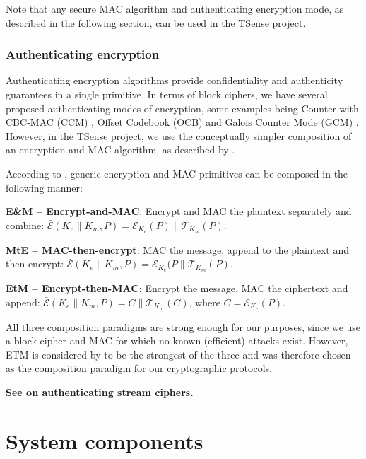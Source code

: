 Note that any secure MAC algorithm and authenticating encryption mode, as described in the following section, can be used in the TSense project.

\subsubsection{Authenticating encryption}

Authenticating encryption algorithms provide confidentiality and authenticity guarantees in a single primitive. In terms of block ciphers, we have several proposed authenticating modes of encryption, some examples being Counter with CBC-MAC (CCM) , Offset Codebook (OCB) \cite{rogaway2003} and Galois Counter Mode (GCM) . However, in the TSense project, we use the conceptually simpler composition of an encryption and MAC algorithm, as described by .

According to , generic encryption and MAC primitives can be composed in the following manner:
%
\begin{description}
\item \textbf{E\&M -- Encrypt-and-MAC}: Encrypt and MAC the plaintext separately and combine: $\bar{\mathcal{E}}(K_e \parallel K_m,P) = \mathcal{E}_{K_e}(P) \parallel \mathcal{T}_{K_m}(P)$.
\item \textbf{MtE -- MAC-then-encrypt}: MAC the message, append to the plaintext and then encrypt: $\bar{\mathcal{E}}(K_e \parallel K_m,P) =\mathcal{E}_{K_e}(P \parallel \mathcal{T}_{K_m}(P)$.
\item \textbf{EtM -- Encrypt-then-MAC}: Encrypt the message, MAC the ciphertext and append: $\bar{\mathcal{E}}(K_e \parallel K_m,P) = C \parallel \mathcal{T}_{K_m}(C)$, where $C=\mathcal{E}_{K_e}(P)$.
\end{description}

All three composition paradigms are strong enough for our purposes, since we use a block cipher and MAC for which no known (efficient) attacks exist. However, ETM is considered by \citeauthor{bellare2007} to be the strongest of the three and was therefore chosen as the composition paradigm for our cryptographic protocols.

\textbf{See \cite{teo2009} on authenticating stream ciphers.}

\section{System components}

